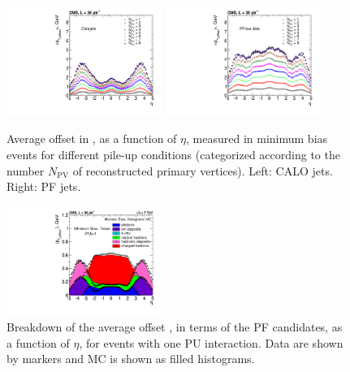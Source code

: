 \begin{figure}[ht!]
  \begin{center}
    \includegraphics[width=0.45\textwidth]{Figures/JEC/p_AvgpTinC5_NoisePileup_PV_7TeV_run2010B_JNST}
    \includegraphics[width=0.45\textwidth]{Figures/JEC/p_AvgpTinPF5_NoisePileup_PV_7TeV_run2010B_JNST}
    \caption{Average offset in \pt, as a function of $\eta$, measured in minimum bias events for different pile-up conditions (categorized according to the number $N_\text{PV}$ of reconstructed primary vertices). Left: CALO jets. Right: PF jets.}
    \label{fig:offset}
  \end{center}
\end{figure}

\begin{figure}[ht!]
  \begin{center}
    \includegraphics[width=0.45\textwidth]{Figures/JEC/h_AvgpTinPF5_stacked_MinBiasMinusZB}
    \caption{Breakdown of the average offset \pt, in terms of the PF candidates, as a function of $\eta$, for events with one PU interaction. Data are shown by markers and MC is shown as filled histograms.}
    \label{fig:PUcomposition}
  \end{center}
\end{figure}

